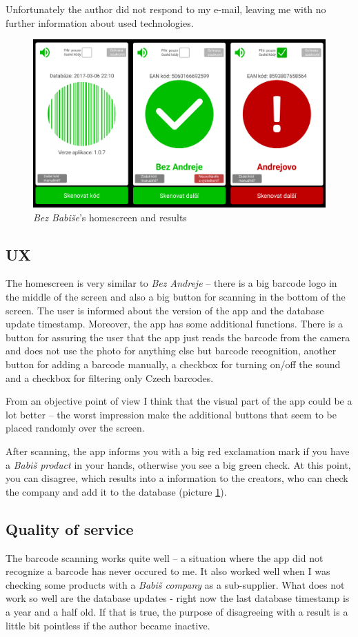 \documentclass[12pt]{article} %
\begin{document}
Unfortunately the author did not respond to my e-mail, leaving me with no further information about used technologies.
\begin{figure}[h]
	\centering
	\includegraphics[width=.8\linewidth]{bez_babise.jpg}
	\caption{\textit{Bez Babiše}'s homescreen and results}
	\label{fig:bezbabise}
\end{figure}
\newpage
\subsection{UX}
The homescreen is very similar to \textit{Bez Andreje} – there is a big barcode logo in the middle of the screen and also a big button for scanning in the bottom of the screen. The user is informed about the version of the app and the database update timestamp. Moreover, the app has some additional functions. There is a button for assuring the user that the app just reads the barcode from the camera and does not use the photo for anything else but barcode recognition, another button for adding a barcode manually, a checkbox for turning on/off the sound and a checkbox for filtering only Czech barcodes. 

From an objective point of view I think that the visual part of the app could be a lot better – the worst impression make the additional buttons that seem to be placed randomly over the screen. 

After scanning, the app informs you with a big red exclamation mark if you have a \textit{Babiš product} in your hands, otherwise you see a big green check. At this point, you can disagree, which results into a information to the creators, who can check the company and add it to the database (picture \ref{fig:bezbabise}).

\subsection{Quality of service}
The barcode scanning works quite well – a situation where the app did not recognize a barcode has never occured to me. It also worked well when I was checking some products with a \textit{Babiš company} as a sub-supplier. What does not work so well are the database updates - right now the last database timestamp is a year and a half old. If that is true, the purpose of disagreeing with a result is a little bit pointless if the author became inactive.
\end{document}

